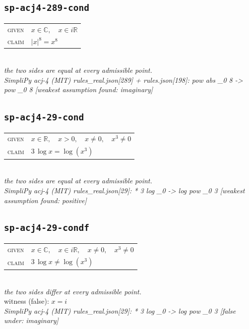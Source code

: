 \documentclass[11pt]{article}
\begin{document}
\subsection*{\texttt{sp-acj4-289-cond}}
\begin{tabular}{@{}l@{\quad}l@{}}
\textsc{given} & $x \in \mathbb{C},\quad x \in i\mathbb{R}$ \\[4pt]
\textsc{claim} & $\displaystyle \left|x\right|^{8} = x^{8}$ \\
\end{tabular}\\[2pt]
{\small\emph{the two sides are equal at every admissible point.}}\\
\emph{SimpliPy acj-4 (MIT) rules\_real.json[289] + rules.json[198]: pow abs \_0 8  ->  pow \_0 8  [weakest assumption found: imaginary]}\\

\subsection*{\texttt{sp-acj4-29-cond}}
\begin{tabular}{@{}l@{\quad}l@{}}
\textsc{given} & $x \in \mathbb{R},\quad x > 0,\quad x \neq 0,\quad x^{3} \neq 0$ \\[4pt]
\textsc{claim} & $\displaystyle 3 \, \log x = \log\left(x^{3}\right)$ \\
\end{tabular}\\[2pt]
{\small\emph{the two sides are equal at every admissible point.}}\\
\emph{SimpliPy acj-4 (MIT) rules\_real.json[29]: * 3 log \_0  ->  log pow \_0 3  [weakest assumption found: positive]}\\

\subsection*{\texttt{sp-acj4-29-condf}}
\begin{tabular}{@{}l@{\quad}l@{}}
\textsc{given} & $x \in \mathbb{C},\quad x \in i\mathbb{R},\quad x \neq 0,\quad x^{3} \neq 0$ \\[4pt]
\textsc{claim} & $\displaystyle 3 \, \log x \neq \log\left(x^{3}\right)$ \\
\end{tabular}\\[2pt]
{\small\emph{the two sides differ at every admissible point.}}\\
{\footnotesize\color{gray}witness (false): $x = i$}\\
\emph{SimpliPy acj-4 (MIT) rules\_real.json[29]: * 3 log \_0  ->  log pow \_0 3  [false under: imaginary]}\\
\end{document}
